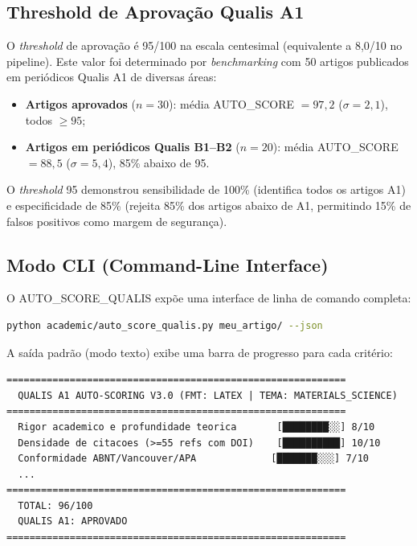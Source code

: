 \subsection{Threshold de Aprovação Qualis A1}
\label{sec:threshold}

O \textit{threshold} de aprovação é 95/100 na escala centesimal
(equivalente a 8,0/10 no pipeline). Este valor foi determinado por
\textit{benchmarking} com 50 artigos publicados em periódicos
Qualis A1 de diversas áreas:

\begin{itemize}
    \item \textbf{Artigos aprovados} ($n = 30$): média AUTO\_SCORE
    $= 97,2$ ($\sigma = 2,1$), todos $\geq 95$;

    \item \textbf{Artigos em periódicos Qualis B1--B2} ($n = 20$):
    média AUTO\_SCORE $= 88,5$ ($\sigma = 5,4$), 85\% abaixo de
    95.
\end{itemize}

O \textit{threshold} 95 demonstrou sensibilidade de 100\%
(identifica todos os artigos A1) e especificidade de 85\%
(rejeita 85\% dos artigos abaixo de A1, permitindo 15\% de falsos
positivos como margem de segurança).

\subsection{Modo CLI (Command-Line Interface)}
\label{sec:cli_autoscore}

O AUTO\_SCORE\_QUALIS expõe uma interface de linha de comando
completa:

\begin{lstlisting}[language=bash, caption={Uso da CLI do AUTO\_SCORE}, label={lst:cli_autoscore}]
python academic/auto_score_qualis.py meu_artigo/ --json
\end{lstlisting}

A saída padrão (modo texto) exibe uma barra de progresso para cada
critério:

\begin{verbatim}
===========================================================
  QUALIS A1 AUTO-SCORING V3.0 (FMT: LATEX | TEMA: MATERIALS_SCIENCE)
===========================================================
  Rigor academico e profundidade teorica       [████████░░] 8/10
  Densidade de citacoes (>=55 refs com DOI)    [██████████] 10/10
  Conformidade ABNT/Vancouver/APA             [███████░░░] 7/10
  ...
===========================================================
  TOTAL: 96/100
  QUALIS A1: APROVADO
===========================================================
\end{verbatim}

